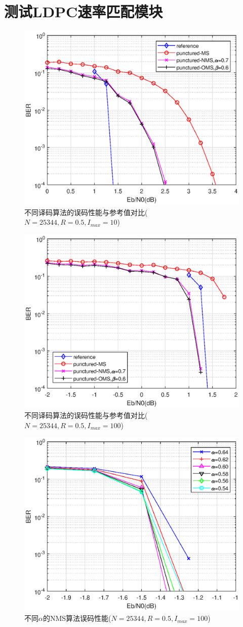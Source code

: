 \documentclass{article}
\begin{document}
\section{测试LDPC速率匹配模块}
\begin{figure}[H]
	\centering
	\includegraphics[width = .75\textwidth]{noms_r12_Imax10.eps}
	\caption{{不同译码算法的误码性能与参考值对比($N=25344,R=0.5,I_{max}=10$)}}
\end{figure}
\begin{figure}[H]
	\centering
	\includegraphics[width = .75\textwidth]{noms_r12.eps}
	\caption{{不同译码算法的误码性能与参考值对比($N=25344,R=0.5,I_{max}=100$)}}
\end{figure}
\begin{figure}[H]
	\centering
	\includegraphics[width = .75\textwidth]{nms064054.eps}
	\caption{{不同$\alpha$的NMS算法误码性能($N=25344,R=0.5,I_{max}=100$)}}
\end{figure}
\end{document}
